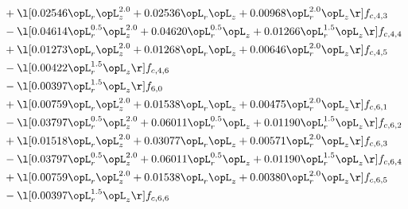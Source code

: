 \begin{alignat}{2}
& + \l[  0.02546 \opL_r \opL_z^{2.0} +  0.02536 \opL_r \opL_z +  0.00968 \opL_r^{2.0} \opL_z  \r] f_{c,4,3} \nonumber \\ 
& - \l[  0.04614 \opL_r^{0.5} \opL_z^{2.0} +  0.04620 \opL_r^{0.5} \opL_z +  0.01266 \opL_r^{1.5} \opL_z  \r] f_{c,4,4} \nonumber \\ 
& + \l[  0.01273 \opL_r \opL_z^{2.0} +  0.01268 \opL_r \opL_z +  0.00646 \opL_r^{2.0} \opL_z  \r] f_{c,4,5} \nonumber \\ 
& - \l[  0.00422 \opL_r^{1.5} \opL_z  \r] f_{c,4,6} \nonumber \\ 
& - \l[  0.00397 \opL_r^{1.5} \opL_z  \r] f_{6,0} \nonumber \\ 
& + \l[  0.00759 \opL_r \opL_z^{2.0} +  0.01538 \opL_r \opL_z +  0.00475 \opL_r^{2.0} \opL_z  \r] f_{c,6,1} \nonumber \\ 
& - \l[  0.03797 \opL_r^{0.5} \opL_z^{2.0} +  0.06011 \opL_r^{0.5} \opL_z +  0.01190 \opL_r^{1.5} \opL_z  \r] f_{c,6,2} \nonumber \\ 
& + \l[  0.01518 \opL_r \opL_z^{2.0} +  0.03077 \opL_r \opL_z +  0.00571 \opL_r^{2.0} \opL_z  \r] f_{c,6,3} \nonumber \\ 
& - \l[  0.03797 \opL_r^{0.5} \opL_z^{2.0} +  0.06011 \opL_r^{0.5} \opL_z +  0.01190 \opL_r^{1.5} \opL_z  \r] f_{c,6,4} \nonumber \\ 
& + \l[  0.00759 \opL_r \opL_z^{2.0} +  0.01538 \opL_r \opL_z +  0.00380 \opL_r^{2.0} \opL_z  \r] f_{c,6,5} \nonumber \\ 
& - \l[  0.00397 \opL_r^{1.5} \opL_z  \r] f_{c,6,6} \nonumber \\ 
\end{alignat} 


